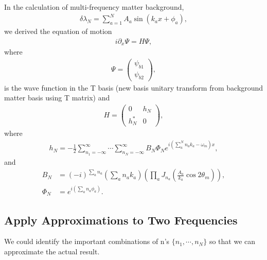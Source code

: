 \documentclass[letterpaper,12pt,english]{sphinxmanual}
\begin{document}
In the calculation of multi-frequency matter background,
\begin{equation*}
\begin{split}\delta\lambda_N = \sum_{a=1}^N A_a \sin(k_a x + \phi_a),\end{split}
\end{equation*}
we derived the equation of motion
\begin{equation*}
\begin{split}i \partial_x \Psi = H \Psi,\end{split}
\end{equation*}
where
\begin{equation*}
\begin{split}\Psi = \begin{pmatrix}
\psi_{b1} \\
\psi_{b2}
\end{pmatrix},\end{split}
\end{equation*}
is the wave function in the T basis (new basis unitary transform from background matter basis using T matrix) and
\begin{equation*}
\begin{split}H = \begin{pmatrix}
0 & h_N \\
h_N^* & 0
\end{pmatrix},\end{split}
\end{equation*}
where
\begin{equation*}
\begin{split}h_N = -\frac{1}{2}\sum_{n_1=-\infty}^\infty \cdots \sum_{n_N=-\infty}^\infty B_N\Phi_N e^{i(\sum_a^{N} n_a k_a - \omega_m)x},\end{split}
\end{equation*}
and
\begin{equation*}
\begin{split}B_N &= (-i)^{\sum_a n_a} \left( \sum_a n_a k_a \right) \left( \prod_a J_{n_a}\left( \frac{A_a}{k_a}\cos 2\theta_m \right) \right),\\
\Phi_N &= e^{i\left( \sum_a n_a \phi_a \right)}.\end{split}
\end{equation*}

\subsection{Apply Approximations to Two Frequencies}
\label{\detokenize{matter-stimulated/interference:apply-approximations-to-two-frequencies}}
We could identify the important combinations of n's \(\{n_1, \cdots, n_N \}\) so that we can approximate the actual result.
\end{document}
